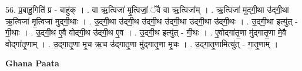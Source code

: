 \documentclass[17pt]{extarticle}
\begin{document}
56. प्र॒बाहु॒गिति॑ प्र - बाहु॑क् । . वा ऋ॒त्विजा॑ मृ॒त्विजां॒ ॅवै वा ऋ॒त्विजा᳚म् । . ऋ॒त्विजा॑ मुद्‍गी॒था उ॑द्‍गी॒था ऋ॒त्विजा॑ मृ॒त्विजा॑ मुद्‍गी॒थाः । . उ॒द्‍गी॒था उ॑द्‍गी॒थ उ॑द्‍गी॒थ उ॑द्‍गी॒था उ॑द्‍गी॒था उ॑द्‍गी॒थः । . उ॒द्‍गी॒था इत्यु॑त् - गी॒थाः । . उ॒द्‍गी॒थ ए॒वै वोद्‍गी॒थ उ॑द्‍गी॒थ ए॒व । . उ॒द्‍गी॒थ इत्यु॑त् - गी॒थः । . ए॒वोद्‍गा॑तृ॒णा मु॑द्‍गातृ॒णा मे॒वै वोद्‍गा॑तृ॒णाम् । . उ॒द्‍गा॒तृ॒णा मृ॒च ऋ॒च उ॑द्‍गातृ॒णा मु॑द्‍गातृ॒णा मृ॒चः । . उ॒द्‍गा॒तृ॒णामित्यु॑त् - गा॒तृ॒णाम् । \newline

\textbf{Ghana Paata } \newline
\end{document}
